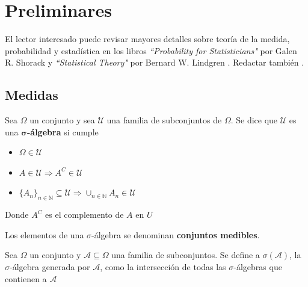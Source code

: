 
\chapter{Preliminares}

El lector interesado puede revisar mayores detalles sobre teoría de la medida, probabilidad y estadística en los libros \textit{``Probability for Statisticians"} por Galen R. Shorack \cite{probabilidad_shorack} y \textit{``Statistical Theory"} por Bernard W. Lindgren \cite{estadistica_lindgren}.
Redactar también \cite{estacionariedad_lindgren}.


\section{Medidas}

\begin{definicion}%
Sea $\Omega$ un conjunto y sea $\mathcal{U}$ una familia de subconjuntos de $\Omega$. Se dice que 
$\mathcal{U}$ es una \textbf{$\boldsymbol{\sigma}$-álgebra} si cumple
\begin{itemize}
\item $\Omega \in \mathcal{U}$
\item $A \in \mathcal{U} \Rightarrow A^{C} \in \mathcal{U}$
\item 
$ \displaystyle \{ A_n \}_{n\in \mathbb{N}} \subseteq \mathcal{U} 
\Rightarrow \cup_{n\in \mathbb{N}} A_n \in \mathcal{U}$
\end{itemize}
Donde $A^{C}$ es el complemento de $A$ en $U$
\end{definicion}

Los elementos de una $\sigma$-álgebra se denominan \textbf{conjuntos medibles}. 

\begin{definicion}
Sea $\Omega$ un conjunto y $\mathcal{A} \subseteq \Omega$ una familia de subconjuntos. Se define a $\sigma(\mathcal{A})$, la $\sigma$-álgebra generada por $\mathcal{A}$, como la intersección de todas las $\sigma$-álgebras que contienen a $\mathcal{A}$  
\end{definicion}

